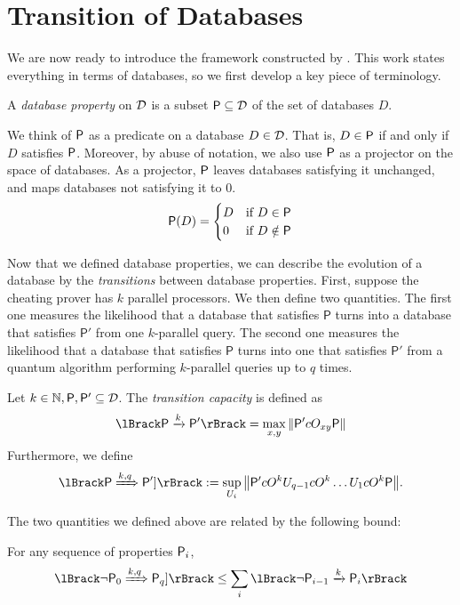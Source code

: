 \section{Transition of Databases}

We are now ready to introduce the framework constructed by \cite{main-result}.
This work states everything in terms of databases, so we first develop a key piece of terminology.
\begin{defn}
	A \emph{database property} on $\mathcal{D}$ is a subset $\mathsf{P}\subseteq\mathcal{D}$ of the set of databases $D$.
\end{defn}
We think of $\mathsf{P}$ as a predicate on a database $D\in\mathcal{D}$.
That is, $D\in\mathsf{P}$ if and only if $D$ satisfies $\mathsf{P}$.
Moreover, by abuse of notation, we also use $\mathsf{P}$ as a projector on the space of databases.
As a projector, $\mathsf{P}$ leaves databases satisfying it unchanged, and maps databases not satisfying it to $0$.
$$
\mathsf{P}(D) = \begin{cases}
	D & \mbox{if } D\in\mathsf{P} \\
	0 & \mbox{if } D\notin\mathsf{P}
\end{cases}
$$

Now that we defined database properties, we can describe the evolution of a database by the \emph{transitions} between database properties.
First, suppose the cheating prover has $k$ parallel processors.
We then define two quantities.
The first one measures the likelihood that a database that satisfies $\mathsf{P}$
turns into a database that satisfies $\mathsf{P}'$ from one $k$-parallel query.
The second one measures the likelihood that a database that satisfies $\mathsf{P}$
turns into one that satisfies $\mathsf{P}'$ from a quantum algorithm performing $k$-parallel queries up to $q$ times.

\begin{defn}
	Let $k\in\mathbb{N}, \mathsf{P}, \mathsf{P}'\subseteq\mathcal{D}$. The \emph{transition capacity} is defined as
	$$\lBrack \sfP \xrightarrow{k} \sfP'\rBrack = \max_{x, y} \norm{\sfP' cO_{xy} \sfP}$$
	Furthermore, we define
	$$\lBrack\sfP\xRightarrow{k,q}\sfP']\rBrack:=\sup_{U_i}\norm{\sfP' cO^k U_{q-1} cO^k\ldots U_1 cO^k \sfP}.$$
\end{defn}

The two quantities we defined above are related by the following bound:
\begin{lem}
	\label{transition-multi-to-single}
	For any sequence of properties $\mathsf{P}_i$,
	$$\lBrack\neg \sfP_0\xRightarrow{k, q}\sfP_q]\rBrack
	\leq\sum_{i}\lBrack\neg \sfP_{i-1}\xrightarrow{k}\sfP_i\rBrack$$
\end{lem}

